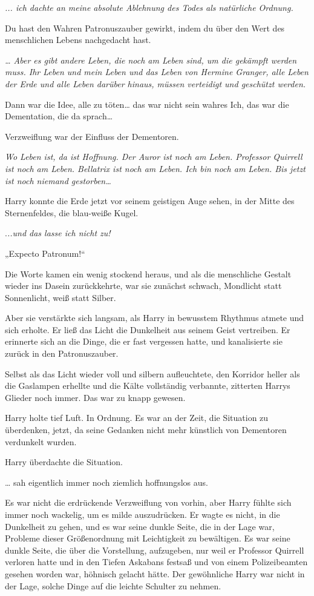 {\emph{..\emph{. ich dachte an meine absolute Ablehnung des Todes als natürliche Ordnung.}}

Du hast den Wahren Patronuszauber gewirkt, indem du über den Wert des menschlichen Lebens nachgedacht hast.

\emph{… Aber es gibt andere Leben, die noch am Leben sind, um die gekämpft werden muss. Ihr Leben und mein Leben und das Leben von Hermine Granger, alle Leben der Erde und alle Leben darüber hinaus, müssen verteidigt und geschützt werden.}

Dann war die Idee, alle zu töten… das war nicht sein wahres Ich, das war die Dementation, die da sprach…

Verzweiflung war der Einfluss der Dementoren.

\emph{Wo Leben ist, da ist Hoffnung. Der Auror ist noch am Leben. Professor Quirrell ist noch am Leben. Bellatrix ist noch am Leben. Ich bin noch am Leben. Bis jetzt ist noch niemand gestorben…}

Harry konnte die Erde jetzt vor seinem geistigen Auge sehen, in der Mitte des Sternenfeldes, die blau-weiße Kugel.

.\emph{..und das lasse ich nicht zu!}

„Expecto Patronum!“

Die Worte kamen ein wenig stockend heraus, und als die menschliche Gestalt wieder ins Dasein zurückkehrte, war sie zunächst schwach, Mondlicht statt Sonnenlicht, weiß statt Silber.

Aber sie verstärkte sich langsam, als Harry in bewusstem Rhythmus atmete und sich erholte. Er ließ das Licht die Dunkelheit aus seinem Geist vertreiben. Er erinnerte sich an die Dinge, die er fast vergessen hatte, und kanalisierte sie zurück in den Patronuszauber.

Selbst als das Licht wieder voll und silbern aufleuchtete, den Korridor heller als die Gaslampen erhellte und die Kälte vollständig verbannte, zitterten Harrys Glieder noch immer. Das war zu knapp gewesen.

Harry holte tief Luft. In Ordnung. Es war an der Zeit, die Situation zu überdenken, jetzt, da seine Gedanken nicht mehr künstlich von Dementoren verdunkelt wurden.

Harry überdachte die Situation.

… sah eigentlich immer noch ziemlich hoffnungslos aus.

Es war nicht die erdrückende Verzweiflung von vorhin, aber Harry fühlte sich immer noch wackelig, um es milde auszudrücken. Er wagte es nicht, in die Dunkelheit zu gehen, und es war seine dunkle Seite, die in der Lage war, Probleme dieser Größenordnung mit Leichtigkeit zu bewältigen. Es war seine dunkle Seite, die über die Vorstellung, aufzugeben, nur weil er Professor Quirrell verloren hatte und in den Tiefen Askabans festsaß und von einem Polizeibeamten gesehen worden war, höhnisch gelacht hätte. Der gewöhnliche Harry war nicht in der Lage, solche Dinge auf die leichte Schulter zu nehmen.

}
